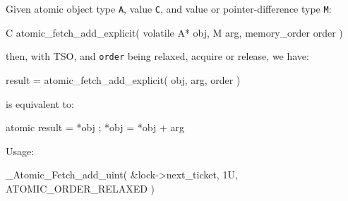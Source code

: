 Given atomic object type \texttt{A}, value \texttt{C},
and value or pointer-difference type \texttt{M}:
\begin{nicec}
C atomic_fetch_add_explicit( volatile A* obj, M arg, memory_order order )
\end{nicec}
then, with TSO, and \texttt{order} being relaxed, acquire or release,
we have:
\begin{nicec}
result = atomic_fetch_add_explicit( obj, arg, order )
\end{nicec}
is equivalent to:
\begin{nicec}
atomic{ result = *obj ; *obj = *obj + arg }
\end{nicec}

Usage:
\begin{nicec}
_Atomic_Fetch_add_uint( &lock->next_ticket, 1U, ATOMIC_ORDER_RELAXED )
\end{nicec}
